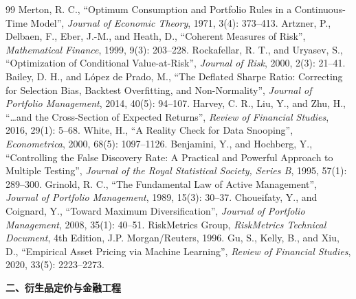 \begin{thebibliography}{99}
 Merton, R. C., ``Optimum Consumption and Portfolio Rules in a Continuous-Time Model'', \emph{Journal of Economic Theory}, 1971, 3(4): 373--413.
 Artzner, P., Delbaen, F., Eber, J.-M., and Heath, D., ``Coherent Measures of Risk'', \emph{Mathematical Finance}, 1999, 9(3): 203--228.
 Rockafellar, R. T., and Uryasev, S., ``Optimization of Conditional Value-at-Risk'', \emph{Journal of Risk}, 2000, 2(3): 21--41.
 Bailey, D. H., and L\'opez de Prado, M., ``The Deflated Sharpe Ratio: Correcting for Selection Bias, Backtest Overfitting, and Non-Normality'', \emph{Journal of Portfolio Management}, 2014, 40(5): 94--107.
 Harvey, C. R., Liu, Y., and Zhu, H., ``\ldots and the Cross-Section of Expected Returns'', \emph{Review of Financial Studies}, 2016, 29(1): 5--68.
 White, H., ``A Reality Check for Data Snooping'', \emph{Econometrica}, 2000, 68(5): 1097--1126.
 Benjamini, Y., and Hochberg, Y., ``Controlling the False Discovery Rate: A Practical and Powerful Approach to Multiple Testing'', \emph{Journal of the Royal Statistical Society, Series B}, 1995, 57(1): 289--300.
 Grinold, R. C., ``The Fundamental Law of Active Management'', \emph{Journal of Portfolio Management}, 1989, 15(3): 30--37.
 Choueifaty, Y., and Coignard, Y., ``Toward Maximum Diversification'', \emph{Journal of Portfolio Management}, 2008, 35(1): 40--51.
 RiskMetrics Group, \emph{RiskMetrics Technical Document}, 4th Edition, J.P. Morgan/Reuters, 1996.
 Gu, S., Kelly, B., and Xiu, D., ``Empirical Asset Pricing via Machine Learning'', \emph{Review of Financial Studies}, 2020, 33(5): 2223--2273.

\item[] \textbf{二、衍生品定价与金融工程}


\end{thebibliography}
